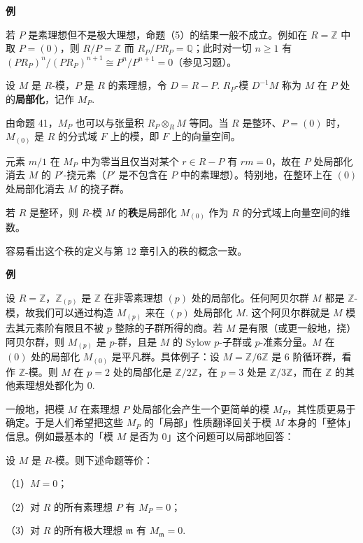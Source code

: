 \noindent\textbf{例}

若 \(P\) 是素理想但不是极大理想，命题（5）的结果一般不成立。例如在 \(R = \mathbb{Z}\) 中取 \(P = (0)\)，则 \(R/P = \mathbb{Z}\) 而 \(R_P/PR_P = \mathbb{Q}\)；此时对一切 \(n \geq 1\) 有 \((PR_P)^n/(PR_P)^{n+1} \cong P^n/P^{n+1} = 0\)（参见习题）。

\begin{definition}
设 \(M\) 是 \(R\)-模，\(P\) 是 \(R\) 的素理想，令 \(D = R-P\). \(R_P\)-模 \(D^{-1}M\) 称为 \(M\) 在 \(P\) 处的\textbf{局部化}，记作 \(M_P\).
\end{definition}

由命题 41，\(M_P\) 也可以与张量积 \(R_P \otimes_RM\) 等同。当 \(R\) 是整环、\(P = (0)\) 时，\(M_{(0)}\) 是 \(R\) 的分式域 \(F\) 上的模，即 \(F\) 上的向量空间。

元素 \(m/1\) 在 \(M_P\) 中为零当且仅当对某个 \(r \in R-P\) 有 \(rm = 0\)，故在 \(P\) 处局部化消去 \(M\) 的 \(P'\)-挠元素（\(P'\) 是不包含在 \(P\) 中的素理想）。特别地，在整环上在 \((0)\) 处局部化消去 \(M\) 的挠子群。

\begin{definition}
若 \(R\) 是整环，则 \(R\)-模 \(M\) 的\textbf{秩}是局部化 \(M_{(0)}\) 作为 \(R\) 的分式域上向量空间的维数。
\end{definition}

容易看出这个秩的定义与第 12 章引入的秩的概念一致。

\noindent\textbf{例}

设 \(R = \mathbb{Z}\)，\(\mathbb{Z}_{(p)}\) 是 \(\mathbb{Z}\) 在非零素理想 \((p)\) 处的局部化。任何阿贝尔群 \(M\) 都是 \(\mathbb{Z}\)-模，故我们可以通过构造 \(M_{(p)}\) 来在 \((p)\) 处局部化 \(M\). 这个阿贝尔群就是 \(M\) 模去其元素阶有限且不被 \(p\) 整除的子群所得的商。若 \(M\) 是有限（或更一般地，挠）阿贝尔群，则 \(M_{(p)}\) 是 \(p\)-群，且是 \(M\) 的 Sylow \(p\)-子群或 \(p\)-准素分量。\(M\) 在 \((0)\) 处的局部化 \(M_{(0)}\) 是平凡群。具体例子：设 \(M = \mathbb{Z}/6\mathbb{Z}\) 是 6 阶循环群，看作 \(\mathbb{Z}\)-模。则 \(M\) 在 \(p = 2\) 处的局部化是 \(\mathbb{Z}/2\mathbb{Z}\)，在 \(p = 3\) 处是 \(\mathbb{Z}/3\mathbb{Z}\)，而在 \(\mathbb{Z}\) 的其他素理想处都化为 0.

一般地，把模 \(M\) 在素理想 \(P\) 处局部化会产生一个更简单的模 \(M_P\)，其性质更易于确定。于是人们希望把这些 \(M_P\) 的「局部」性质翻译回关于模 \(M\) 本身的「整体」信息。例如最基本的「模 \(M\) 是否为 0」这个问题可以局部地回答：

\begin{proposition}\label{pro:15.47}
设 \(M\) 是 \(R\)-模。则下述命题等价：

（1）\(M = 0\)；

（2）对 \(R\) 的所有素理想 \(P\) 有 \(M_P = 0\)；

（3）对 \(R\) 的所有极大理想 \(\mathfrak{m}\) 有 \(M_{\mathfrak{m}} = 0\).
\end{proposition}

